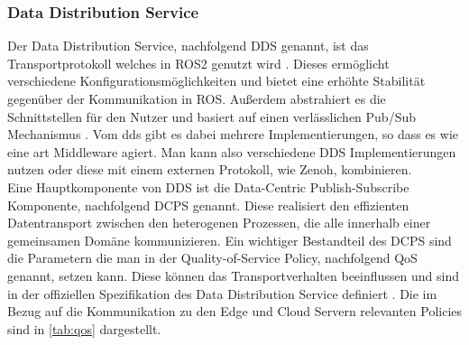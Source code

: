 \subsubsection{Data Distribution Service} %
\label{ssub:Data Distribution Service}

Der Data Distribution Service, nachfolgend DDS genannt, ist das Transportprotokoll welches in ROS2 genutzt wird \cite{ConceptsROSDocumentation}. Dieses ermöglicht verschiedene Konfigurationsmöglichkeiten und bietet eine erhöhte Stabilität gegenüber der Kommunikation in ROS. Außerdem abstrahiert es die Schnittstellen für den Nutzer und basiert auf einen verlässlichen Pub/Sub Mechanismus \cite{maruyamaExploringPerformanceROS22016}. Vom \acrlong{dds} gibt es dabei mehrere Implementierungen, so dass es wie eine art Middleware agiert. Man kann also verschiedene DDS Implementierungen nutzen oder diese mit einem externen Protokoll, wie Zenoh, kombinieren.\\
Eine Hauptkomponente von DDS ist die Data-Centric Publish-Subscribe Komponente, nachfolgend DCPS genannt. Diese realisiert den effizienten Datentransport zwischen den heterogenen Prozessen, die alle innerhalb einer gemeinsamen Domäne kommunizieren. Ein wichtiger Bestandteil des DCPS sind die Parametern die man in der Quality-of-Service Policy, nachfolgend QoS genannt, setzen kann. Diese können das Transportverhalten beeinflussen und sind in der offiziellen Spezifikation des Data Distribution Service definiert \cite{DataDistributionService}. Die im Bezug auf die Kommunikation zu den Edge und Cloud Servern relevanten Policies sind in \ref{tab:qos} dargestellt.

